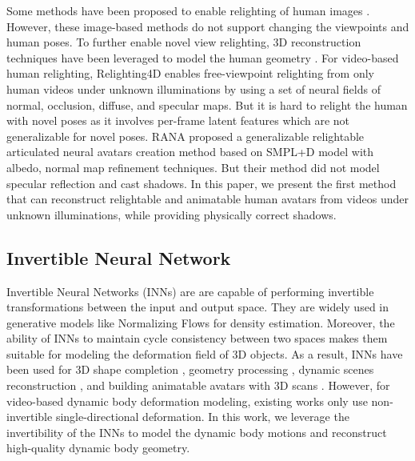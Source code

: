 Some methods have been proposed to enable relighting of human images \cite{sun2019single, wang2020single, zhou2019deep, kanamori2019relighting, pandey2021total, ji2022geometry}. However, these image-based methods do not support changing the viewpoints and human poses. 
To further enable novel view relighting, 3D reconstruction techniques have been leveraged to model the human geometry \cite{guo2019relightables}. 
For video-based human relighting, Relighting4D \cite{Relighting4D} enables free-viewpoint relighting from only human videos under unknown illuminations by using a set of neural fields of normal, occlusion, diffuse, and specular maps. 
But it is hard to relight the human with novel poses as it involves per-frame latent features which are not generalizable for novel poses. 
RANA \cite{rana} proposed a generalizable relightable articulated neural avatars creation method based on SMPL+D \cite{alldieck2018video} model with albedo, normal map refinement techniques. 
But their method did not model specular reflection and cast shadows.
In this paper, we present the first method that can reconstruct relightable and animatable human avatars from videos under unknown illuminations, while providing physically correct shadows.

\subsection{Invertible Neural Network}

Invertible Neural Networks (INNs) \cite{nice, real-nvp, i-resnet, neural-ode, glow} are are capable of performing invertible transformations between the input and output space.
They are widely used in generative models like Normalizing Flows \cite{normalizingflow} for density estimation.
Moreover, the ability of INNs to maintain cycle consistency between two spaces makes them suitable for modeling the deformation field of 3D objects. 
As a result, INNs have been used for 3D shape completion \cite{occflow, shapeflow, neural-part, cadex}, geometry processing \cite{yang2021geometry}, dynamic scenes reconstruction \cite{ndr}, and building animatable avatars with 3D scans \cite{ins}.
However, for video-based dynamic body deformation modeling, existing works only use non-invertible single-directional deformation.
In this work, we leverage the invertibility of the INNs to model the dynamic body motions and reconstruct high-quality dynamic body geometry.

